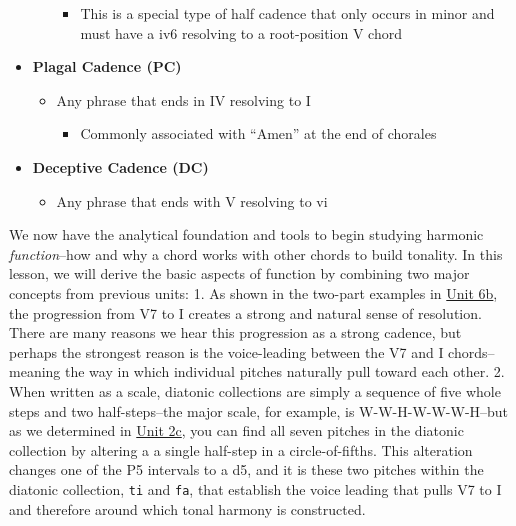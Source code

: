 \documentclass{book}
\providecommand{\tightlist}{%
  \setlength{\itemsep}{0pt}\setlength{\parskip}{0pt}}
\begin{document}
\begin{itemize}
\begin{itemize}
    \begin{itemize}
    \tightlist
    \item
      This is a special type of half cadence that only occurs in minor and
      must have a iv6 resolving to a root-position V chord
    \end{itemize}
  \end{itemize}
\item
  \textbf{Plagal Cadence (PC)}

  \begin{itemize}
  \tightlist
  \item
    Any phrase that ends in IV resolving to I

    \begin{itemize}
    \tightlist
    \item
      Commonly associated with ``Amen'' at the end of chorales
    \end{itemize}
  \end{itemize}
\item
  \textbf{Deceptive Cadence (DC)}

  \begin{itemize}
  \tightlist
  \item
    Any phrase that ends with V resolving to vi
  \end{itemize}
\end{itemize}

We now have the analytical foundation and tools to begin studying harmonic
\emph{function}--how and why a chord works with other chords to build
tonality. In this lesson, we will derive the basic aspects of function by
combining two major concepts from previous units: 1. As shown in the two-part
examples in \href{06-intro-harmonic/b1-diafuncvoicelead.html}{Unit 6b}, the
progression from V7 to I creates a strong and natural sense of resolution.
There are many reasons we hear this progression as a strong cadence, but
perhaps the strongest reason is the voice-leading between the V7 and I
chords--meaning the way in which individual pitches naturally pull toward each
other. 2. When written as a scale, diatonic collections are simply a sequence
of five whole steps and two half-steps--the major scale, for example, is
W-W-H-W-W-W-H--but as we determined in
\href{02-int-scales-keys/d1-keys.html}{Unit 2c}, you can find all seven
pitches in the diatonic collection by altering a a single half-step in a
circle-of-fifths. This alteration changes one of the P5 intervals to a d5, and
it is these two pitches within the diatonic collection, \texttt{ti} and
\texttt{fa}, that establish the voice leading that pulls V7 to I and therefore
around which tonal harmony is constructed.
\end{document}
